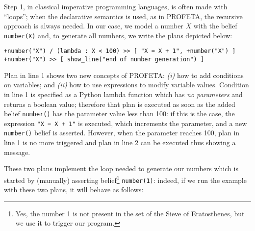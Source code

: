 Step 1, in classical imperative programming languages, is often made with
``loops''; when the declarative semantics is used, as in PROFETA, the
recursive approach is always needed.
In our case, we model a number $X$ with the belief \texttt{number(X)} and,
to generate all numbers, we write the plans depicted below:
\python%
\begin{lstlisting}
+number("X") / (lambda : X < 100) >> [ "X = X + 1", +number("X") ]
+number("X") >> [ show_line("end of number generation") ]
\end{lstlisting}
Plan in line 1 shows two new concepts of PROFETA: \emph{(i)} how to add
conditions on variables; and \emph{(ii)} how to use expressions to modify
variable values.
Condition in line 1 is specified as a Python lambda function which has
\emph{no parameters} and returns a boolean value; therefore that plan is
executed as soon as the added belief \texttt{number()} has the parameter
value less than 100: if this is the case, the expression \texttt{"X = X +
  1"} is executed, which increments the parameter, and a new
\texttt{number()} belief is asserted.
However, when the parameter reaches 100, plan in line 1 is no more
triggered and plan in line 2 can be executed thus showing a message.

These two plans implement the loop needed to generate our numbers which
is started by (manually) asserting belief\footnote{Yes, the number 1 is
  not present in the set of the Sieve of Eratosthenes, but we use it to
  trigger our program.} \texttt{number(1)}: indeed,
if we run the example with these two plans, it will behave as follows:

